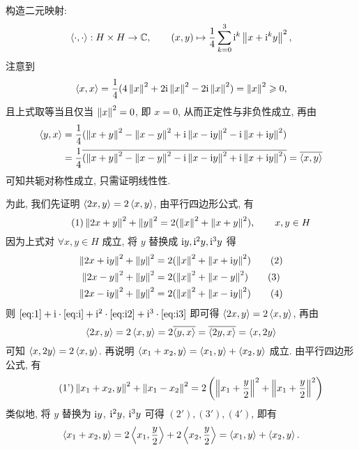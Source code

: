 	\begin{Proof}
		构造二元映射:
		\[
			\left\langle \cdot, \cdot \right\rangle: H\times H\to \mathbb{C}, \qquad(x, y)\mapsto\frac{1}{4}\sum_{k=0}^3\mathrm{i}^k\left\| x+\mathrm{i}^ky \right\|^2,
		\]
		注意到
		\[
			\left\langle x, x \right\rangle=\frac{1}{4}(4\left\| x \right\|^{2}+2\mathrm{i}\left\| x \right\|^{2}-2\mathrm{i}\left\| x \right\|^{2})=\left\| x \right\|^{2}\geqslant0,
		\]
		且上式取等当且仅当 $ \left\| x \right\|^{2}=0 $, 即 $ x=0 $, 从而正定性与非负性成立, 再由
		\[
			\begin{aligned}
				\left\langle y, x \right\rangle & =\frac{1}{4}(\left\| x+y \right\|^{2}-\left\| x-y \right\|^{2}+\mathrm{i}\left\| x-\mathrm{i} y \right\|^{2}-\mathrm{i}\left\| x+\mathrm{i} y \right\|^{2})\\
				& = \frac{1}{4}\overline{(\left\| x+y \right\|^{2}-\left\| x-y \right\|^{2}-\mathrm{i}\left\| x-\mathrm{i} y \right\|^{2}+\mathrm{i}\left\| x+\mathrm{i} y \right\|^{2})} =\overline{\left\langle x, y \right\rangle}
			\end{aligned}
		\]
		可知共轭对称性成立, 只需证明线性性.

		为此, 我们先证明 $ \left\langle 2x, y \right\rangle=2\left\langle x, y \right\rangle $, 由平行四边形公式, 有
		\begin{equation}\tag{1}
			\left\| 2x+y \right\|^{2}+\left\| y \right\|^{2}=2(\left\| x \right\|^{2}+\left\| x+y \right\|^{2}),\qquad x, y\in H\label{eq:1}
		\end{equation}
		因为上式对 $ \forall x, y\in H $ 成立, 将 $ y $ 替换成 $ \mathrm{i} y, \mathrm{i}^{2} y, \mathrm{i}^{3} y $ 得
		\begin{align}
			\left\| 2x+\mathrm{i} y \right\|^{2}+\left\| y \right\|^{2}& =2(\left\| x \right\|^{2}+\left\| x+\mathrm{i} y \right\|^{2})\tag{2}\label{eq:i}\\
			\left\| 2x-y \right\|^{2}+\left\| y \right\|^{2} & =2(\left\| x \right\|^{2}+\left\| x-y \right\|^{2})\tag{3}\label{eq:i2}\\
			\left\| 2x-\mathrm{i} y \right\|^{2}+\left\| y \right\|^{2} & =2(\left\| x \right\|^{2}+\left\| x-\mathrm{i} y \right\|^{2})\label{eq:i3}\tag{4}
		\end{align}
		则 $ \eqref{eq:1}+\mathrm{i}\cdot\eqref{eq:i}+\mathrm{i}^{2}\cdot\eqref{eq:i2}+\mathrm{i}^{3}\cdot\eqref{eq:i3} $ 即可得 $ \left\langle 2x, y \right\rangle=2\left\langle x, y \right\rangle $, 再由
		\[
			\left\langle 2x, y \right\rangle=2\left\langle x, y \right\rangle=2\overline{\left\langle y, x \right\rangle}=\overline{\left\langle 2y, x \right\rangle}=\left\langle x, 2y \right\rangle
		\]
		可知 $ \left\langle x, 2y \right\rangle=2\left\langle x, y \right\rangle $. 再说明 $ \left\langle x_{1}+x_{2}, y \right\rangle=\left\langle x_{1}, y \right\rangle+\left\langle x_{2}, y \right\rangle $ 成立. 由平行四边形公式, 有
		\begin{equation}\tag{1'}
			\left\| x_{1}+x_{2}, y \right\|^{2}+\left\| x_{1}-x_{2} \right\|^{2}=2\left( \left\| x_{1}+\frac{y}{2} \right\|^{2}+\left\| x_{1}+\frac{y}{2} \right\|^{2} \right)
		\end{equation}
		类似地, 将 $ y $ 替换为 $ \mathrm{i} y $, $ \mathrm{i}^{2}y $, $ \mathrm{i}^{3}y $ 可得 $ (2'), (3'), (4') $, 即有
		\[
			\left\langle x_{1}+x_{2}, y \right\rangle=2\left\langle x_{1}, \frac{y}{2} \right\rangle+2\left\langle x_{2}, \frac{y}{2} \right\rangle=\left\langle x_{1}, y \right\rangle+\left\langle x_{2}, y \right\rangle.
		\]


\end{Proof}
